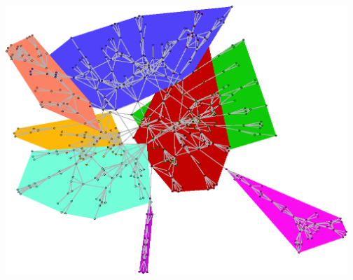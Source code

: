 \documentclass[10pt]{book}
\newcommand{\theversion}{0.0.5}
\begin{document}
\frontmatter




\newtheorem{ex}{Exercise}[chapter]

\begin{latexonly}

\renewcommand{\blankpage}{\thispagestyle{empty} \quad \newpage}



\thispagestyle{empty}

\centerline{\includegraphics[height=4.00in]{cover/network-um-nsf-9-99-10-09.eps}}








\end{latexonly}
\end{document}
